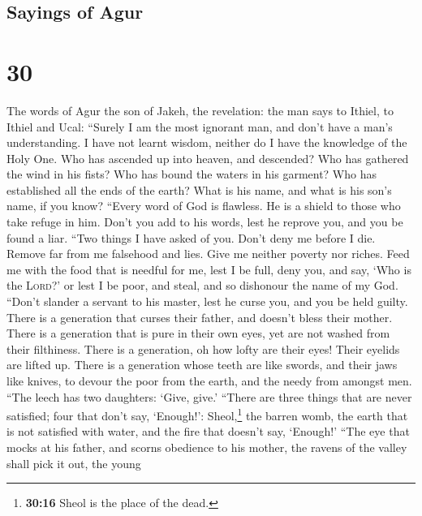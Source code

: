 \hypertarget{sayings-of-agur}{%
\subsection{Sayings of Agur}\label{sayings-of-agur}}

\hypertarget{section-29}{%
\section{30}\label{section-29}}

 The words of Agur the son of Jakeh, the revelation: the
man says to Ithiel, to Ithiel and Ucal:  ``Surely I am the
most ignorant man, and don't have a man's understanding. 
I have not learnt wisdom, neither do I have the knowledge of the Holy
One.  Who has ascended up into heaven, and descended? Who
has gathered the wind in his fists? Who has bound the waters in his
garment? Who has established all the ends of the earth? What is his
name, and what is his son's name, if you know?  ``Every
word of God is flawless. He is a shield to those who take refuge in him.
 Don't you add to his words, lest he reprove you, and you
be found a liar.  ``Two things I have asked of you. Don't
deny me before I die.  Remove far from me falsehood and
lies. Give me neither poverty nor riches. Feed me with the food that is
needful for me,  lest I be full, deny you, and say, `Who
is the \textsc{Lord}?' or lest I be poor, and steal, and so dishonour
the name of my God.  ``Don't slander a servant to his
master, lest he curse you, and you be held guilty.  There
is a generation that curses their father, and doesn't bless their
mother.  There is a generation that is pure in their own
eyes, yet are not washed from their filthiness.  There is
a generation, oh how lofty are their eyes! Their eyelids are lifted up.
 There is a generation whose teeth are like swords, and
their jaws like knives, to devour the poor from the earth, and the needy
from amongst men.  ``The leech has two daughters: `Give,
give.' ``There are three things that are never satisfied; four that
don't say, `Enough!':  Sheol,\footnote{\textbf{30:16}
  Sheol is the place of the dead.} the barren womb, the earth that is
not satisfied with water, and the fire that doesn't say, `Enough!'
 ``The eye that mocks at his father, and scorns obedience
to his mother, the ravens of the valley shall pick it out, the young
